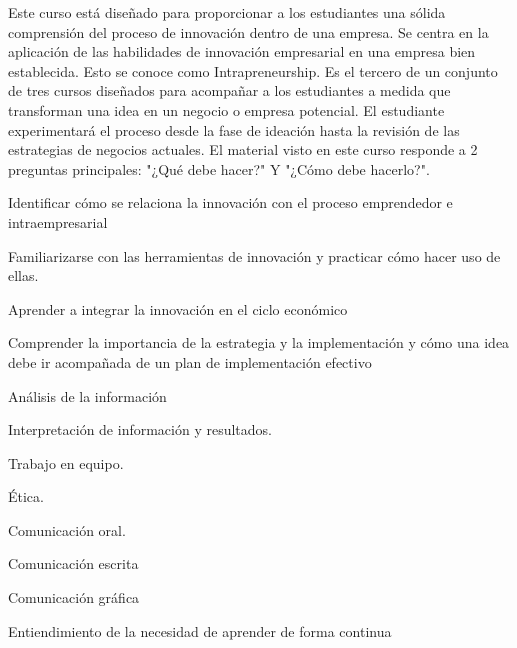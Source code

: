 \begin{syllabus}


\begin{justification}
Este curso está diseñado para proporcionar a los estudiantes una sólida comprensión del proceso de innovación dentro de una empresa. Se centra en la aplicación de las habilidades de innovación empresarial en una empresa bien establecida. Esto se conoce como Intrapreneurship.
Es el tercero de un conjunto de tres cursos diseñados para acompañar a los estudiantes a medida que transforman una idea en un negocio o empresa potencial. El estudiante experimentará el proceso desde la fase de ideación hasta la revisión de las estrategias de negocios actuales.
El material visto en este curso responde a 2 preguntas principales: "¿Qué debe hacer?" Y "¿Cómo debe hacerlo?". 

\end{justification}

\begin{goals}
\item Identificar cómo se relaciona la innovación con el proceso emprendedor e intraempresarial
\item Familiarizarse con las herramientas de innovación y practicar cómo hacer uso de ellas.
\item Aprender a integrar la innovación en el ciclo económico
\item Comprender la importancia de la estrategia y la implementación y cómo una idea debe ir acompañada de un plan de implementación efectivo
\item Análisis de la información
\item Interpretación de información y resultados.
\item Trabajo en equipo.
\item Ética.
\item Comunicación oral.
\item Comunicación escrita
\item Comunicación gráfica
\item Entiendimiento de la necesidad de aprender de forma continua
\end{goals}

\begin{outcomes}
\end{outcomes}


\end{syllabus}
